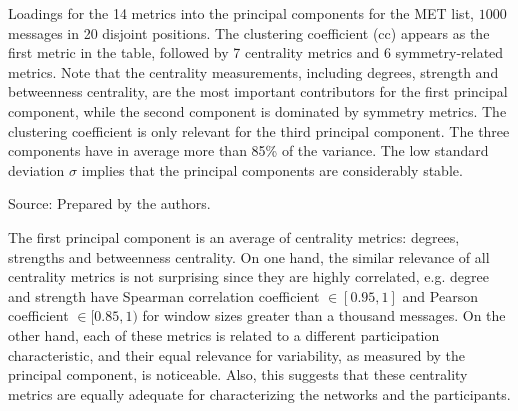 																			\begin{table}[!h]
																			\caption{Loadings for the 14 metrics into the principal components for the MET list, $1000$ messages in 20 disjoint positions. The clustering coefficient (cc) appears as the first metric in the table, followed by 7 centrality metrics and 6 symmetry-related metrics. Note that the centrality measurements, including degrees, strength and betweenness centrality, are the most important contributors for the first principal component, while the second component is dominated by symmetry metrics. The clustering coefficient is only relevant for the third principal component. The three components have in average more than 85\% of the variance.
																			The low standard deviation $\sigma$ implies that the principal components are considerably stable.}
																			\footnotesize
																			
																			\label{tab:pcainin}
																			\begin{flushleft}
																					Source: Prepared by the authors.\
																					\end{flushleft}
																					\end{table}

																					The first principal component is an average of centrality metrics:
																					degrees, strengths and betweenness centrality.
																					On one hand, the similar relevance of all centrality metrics is not surprising since they are highly correlated,
																					e.g. degree and strength have Spearman correlation coefficient $\in [0.95,1]$ 
																					and Pearson coefficient $\in [0.85,1)$ for window sizes greater than a thousand messages.
																					On the other hand, each of these metrics is related to a different participation characteristic,
																					and their equal relevance for variability,
																					as measured by the principal component, is noticeable.
																					Also, this suggests that these centrality metrics 
																					are equally adequate for characterizing the networks
																					and the participants.

